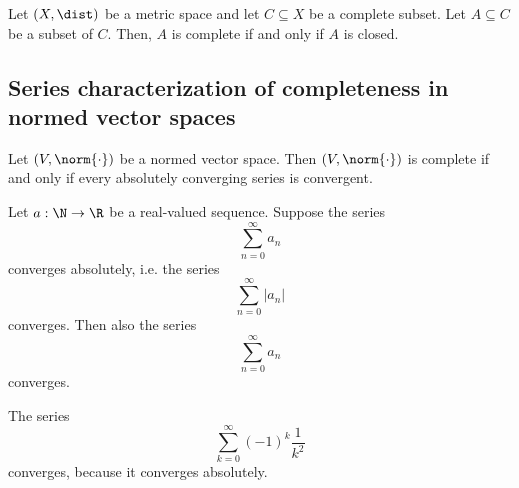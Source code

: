 \begin{proposition}
    Let $(X, \dist)$ be a metric space and let $C \subseteq X$ be a complete subset. Let $A \subseteq C$ be a subset of
    $C$. Then, $A$ is complete if and only if $A$ is closed.
\end{proposition}

\subsection*{Series characterization of completeness in normed vector spaces}
\begin{theorem}
    Let $(V, \norm{\cdot})$ be a normed vector space. Then $(V, \norm{\cdot})$ is complete if and only if every
    absolutely converging series is convergent.
\end{theorem}

\begin{corollary}
    Let $a: \N \to \R$ be a real-valued sequence. Suppose the series
    $$\sum_{n=0}^\infty a_n$$
    converges absolutely, i.e. the series
    $$\sum_{n=0}^\infty |a_n|$$
    converges. Then also the series
    $$\sum_{n=0}^\infty a_n$$
    converges.
\end{corollary}
\begin{example}
    The series
    $$\sum_{k=0}^\infty (-1)^k\frac{1}{k^2}$$
    converges, because it converges absolutely.
\end{example}
